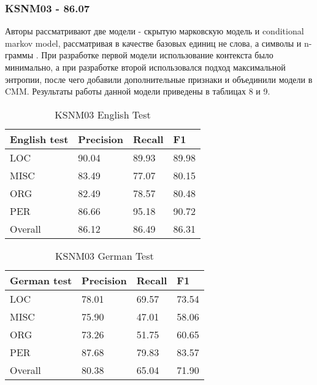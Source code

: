 \subsubsection{KSNM03 - 86.07}

Авторы рассматривают две модели - скрытую марковскую модель и conditional markov model, рассматривая в качестве базовых единиц не слова, а символы и n-граммы \cite{Klein:2003:NER:1119176.1119204}. При разработке первой модели использование контекста было минимально, а при разработке второй использовался подход максимальной энтропии, после чего добавили дополнительные признаки и объединили модели в CMM.
Результаты работы данной модели приведены в таблицах 8 и 9.

\begin{table}[ht]
\centering
\caption{KSNM03 English Test}
\label{3place_eng}
\begin{tabular}{|l|l|l|l|}
\hline
\textbf{English test} & \textbf{Precision} & \textbf{Recall} & \textbf{F1} \\ \hline
LOC                   & 90.04              & 89.93           & 89.98       \\ \hline
MISC                  & 83.49              & 77.07           & 80.15       \\ \hline
ORG                   & 82.49              & 78.57           & 80.48       \\ \hline
PER                   & 86.66              & 95.18           & 90.72       \\ \hline
Overall               & 86.12              & 86.49           & 86.31       \\ \hline
\end{tabular}
\end{table}

\begin{table}[htbp]
\centering
\caption{KSNM03 German Test}
\label{3place_ger}
\begin{tabular}{|l|l|l|l|}
\hline
\textbf{German test} & \textbf{Precision} & \textbf{Recall} & \textbf{F1} \\ \hline
LOC                  & 78.01              & 69.57           & 73.54       \\ \hline
MISC                 & 75.90              & 47.01           & 58.06       \\ \hline
ORG                  & 73.26              & 51.75           & 60.65       \\ \hline
PER                  & 87.68              & 79.83           & 83.57       \\ \hline
Overall              & 80.38              & 65.04           & 71.90       \\ \hline
\end{tabular}
\end{table}

